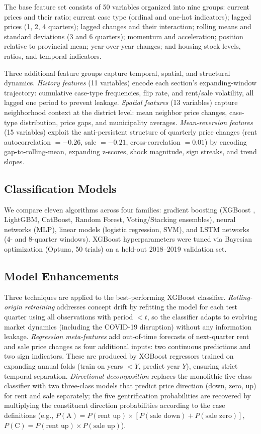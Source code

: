 \documentclass[12pt,a4paper]{article}
\begin{document}
The base feature set consists of 50 variables organized into nine groups: current prices and their ratio; current case type (ordinal and one-hot indicators); lagged prices (1, 2, 4 quarters); lagged changes and their interaction; rolling means and standard deviations (3 and 6 quarters); momentum and acceleration; position relative to provincial mean; year-over-year changes; and housing stock levels, ratios, and temporal indicators.

Three additional feature groups capture temporal, spatial, and structural dynamics. \textit{History features} (11 variables) encode each section's expanding-window trajectory: cumulative case-type frequencies, flip rate, and rent/sale volatility, all lagged one period to prevent leakage. \textit{Spatial features} (13 variables) capture neighborhood context at the district level: mean neighbor price changes, case-type distribution, price gaps, and municipality averages. \textit{Mean-reversion features} (15 variables) exploit the anti-persistent structure of quarterly price changes (rent autocorrelation $= -0.26$, sale $= -0.21$, cross-correlation $= 0.01$) by encoding gap-to-rolling-mean, expanding z-scores, shock magnitude, sign streaks, and trend slopes.

\subsection{Classification Models}

We compare eleven algorithms across four families: gradient boosting (XGBoost \citep{chen2016xgboost}, LightGBM, CatBoost, Random Forest, Voting/Stacking ensembles), neural networks (MLP), linear models (logistic regression, SVM), and LSTM networks (4- and 8-quarter windows). XGBoost hyperparameters were tuned via Bayesian optimization (Optuna, 50 trials) on a held-out 2018--2019 validation set.

\subsection{Model Enhancements}

Three techniques are applied to the best-performing XGBoost classifier. \textit{Rolling-origin retraining} addresses concept drift by refitting the model for each test quarter using all observations with period $< t$, so the classifier adapts to evolving market dynamics (including the COVID-19 disruption) without any information leakage. \textit{Regression meta-features} add out-of-time forecasts of next-quarter rent and sale price changes as four additional inputs: two continuous predictions and two sign indicators. These are produced by XGBoost regressors trained on expanding annual folds (train on years $< Y$, predict year $Y$), ensuring strict temporal separation. \textit{Directional decomposition} replaces the monolithic five-class classifier with two three-class models that predict price direction (down, zero, up) for rent and sale separately; the five gentrification probabilities are recovered by multiplying the constituent direction probabilities according to the case definitions (e.g., $P(\text{A}) = P(\text{rent up}) \times [P(\text{sale down}) + P(\text{sale zero})]$, $P(\text{C}) = P(\text{rent up}) \times P(\text{sale up})$).
\end{document}
